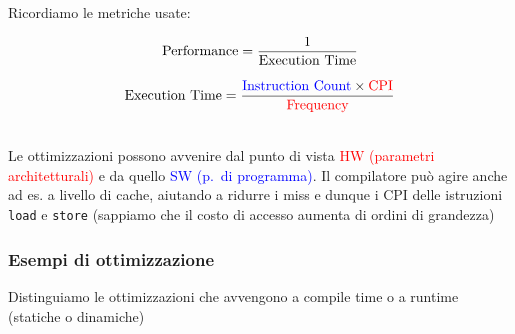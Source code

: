 Ricordiamo le metriche usate:

\noindent\begin{minipage}[c]{.5\textwidth}
\begin{equation*}
  \text{Performance} = {{1}\over\text{Execution Time}}
\end{equation*}
\end{minipage}
\begin{minipage}[c]{.5\textwidth}
\begin{equation*}
  \text{Execution Time} = {\textcolor{blue}{\text{Instruction Count}} \times \textcolor{red}{\text{CPI}} \over \textcolor{red}{\text{Frequency}}}
\end{equation*}
\end{minipage}\\

Le ottimizzazioni possono avvenire dal punto di vista \textcolor{red}{HW (parametri architetturali)} e da quello \textcolor{blue}{SW (p.~di programma)}. Il compilatore pu\`o agire anche ad es. a livello di cache, aiutando a ridurre i miss e dunque i CPI delle istruzioni \lstinline|load| e \lstinline|store| (sappiamo che il costo di accesso aumenta di ordini di grandezza)

\subsubsection{Esempi di ottimizzazione}

\begin{emphasize}
  Distinguiamo le ottimizzazioni che avvengono a compile time o a runtime (statiche o dinamiche)
\end{emphasize}

